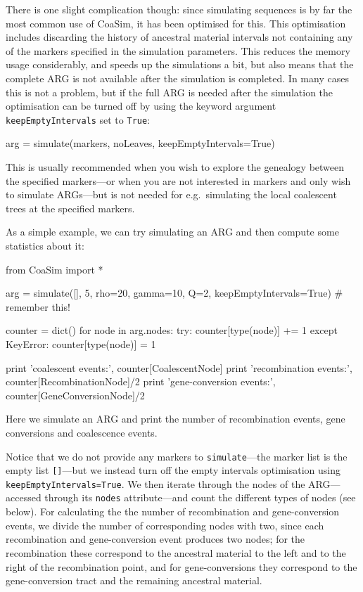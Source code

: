 \documentclass{manual}
\begin{document}
\begin{empfile}
There is one slight complication though: since simulating sequences is
by far the most common use of CoaSim, it has been optimised for this.
This optimisation includes discarding the history of ancestral
material intervals not containing any of the markers specified in the
simulation parameters.  This reduces the memory usage considerably,
and speeds up the simulations a bit, but also means that the complete
ARG is not available after the simulation is completed.  In many cases
this is not a problem, but if the full ARG is needed after the
simulation the optimisation can be turned off by using the keyword
argument \texttt{keepEmptyIntervals} set to \texttt{True}:
\begin{code}
arg = simulate(markers, noLeaves, keepEmptyIntervals=True)
\end{code}

This is usually recommended when you wish to explore the genealogy
between the specified markers---or when you are not interested in
markers and only wish to simulate ARGs---but is not needed for e.g.\
simulating the local coalescent trees at the specified markers.


As a simple example, we can try simulating an ARG and then compute
some statistics about it:
\begin{code}
from CoaSim import *

arg = simulate([], 5, rho=20, gamma=10, Q=2,
               keepEmptyIntervals=True) # remember this!

counter = dict()
for node in arg.nodes:
    try:
        counter[type(node)] += 1
    except KeyError:
        counter[type(node)] = 1

print 'coalescent events:',      counter[CoalescentNode]
print 'recombination events:',   counter[RecombinationNode]/2
print 'gene-conversion events:', counter[GeneConversionNode]/2
\end{code}

\noindent
Here we simulate an ARG and print the number of recombination events,
gene conversions and coalescence events.  

Notice that we do not provide any markers to \texttt{simulate}---the
marker list is the empty list \texttt{[]}---but we instead turn off
the empty intervals optimisation using
\texttt{keepEmptyIntervals=True}.  We then iterate through the nodes
of the ARG---accessed through its \texttt{nodes} attribute---and count
the different types of nodes (see below).  For calculating the the
number of recombination and gene-conversion events, we divide the
number of corresponding nodes with two, since each recombination and
gene-conversion event produces two nodes; for the recombination these
correspond to the ancestral material to the left and to the right of
the recombination point, and for gene-conversions they correspond to
the gene-conversion tract and the remaining ancestral material.


\end{empfile}
\end{document}
